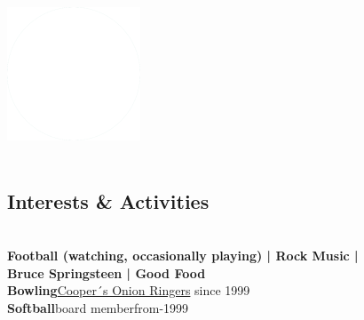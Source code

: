 \documentclass[]{friggeri-cv_reccius-experiment}
\begin{document}
\begin{below1}
    \includegraphics[scale=0.11]{img/WhiteDots.png}\\~  
\end{below1}

\begin{below2}
  \section{Interests \& Activities}
    \\\vspace{1.7mm}
    \textbf{Football (watching, occasionally playing) | Rock Music |\\
    \belowspace 
    Bruce Springsteen | Good Food} \\
    \belowspace
    \textbf{Bowling}\hfill\href{https://kingofqueens.fandom.com/wiki/Doug_Heffernan}{\small Cooper´s Onion Ringers} since 1999\\
    \belowspace
    \textbf{Softball}\hfill\href{https://kingofqueens.fandom.com/wiki/Doug_Heffernan}{\faMousePointer}\thinspace \thinspace board member\thinspace from-1999\\
    
~
\end{below2}
\newcommand{\eduspace}{\vspace*{0.85mm}}
\newcommand{\eduspaceII}{\vspace*{0.8mm}}
\newcommand{\jobspace}{\vspace*{-4.2mm}}
\vspace{-0.5mm}
\end{document}
